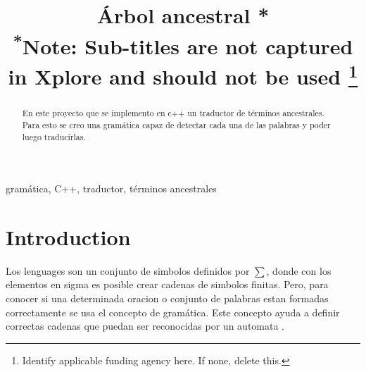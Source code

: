 \documentclass[conference]{IEEEtran}
\begin{document}
\title{\'Arbol ancestral *\\
{\footnotesize \textsuperscript{*}Note: Sub-titles are not captured in Xplore and
should not be used}
\thanks{Identify applicable funding agency here. If none, delete this.}
}

\author{
\and
{}
\and
{}
}

\maketitle

\begin{abstract}
En este proyecto que se implemento en c++ un traductor de t\'erminos ancestrales. Para esto se creo una gram\'atica capaz de detectar cada una de las palabras y poder luego traducirlas. 

\end{abstract}

\begin{IEEEkeywords}
gram\'atica, C++, traductor, t\'erminos ancestrales 
\end{IEEEkeywords}

\section{Introduction}
Los lenguages son un conjunto de simbolos definidos por $\sum$, 
donde con los elementos en sigma es posible crear cadenas de simbolos finitas. Pero, para conocer si una determinada oracion o conjunto de palabras estan formadas correctamente se usa el concepto de gram\'atica. Este concepto ayuda a definir correctas cadenas que puedan ser reconocidas por un automata \cite{b1}. 
\end{document}
